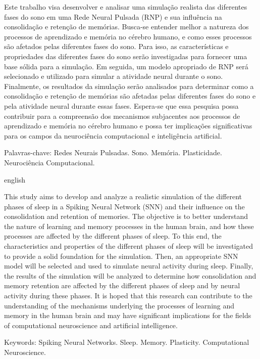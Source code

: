 \begin{resumo}
\noindent
 
Este trabalho visa desenvolver e analisar uma simulação realista das diferentes fases do sono em uma Rede Neural Pulsada (RNP)
e sua influência na consolidação e retenção de memórias. Busca-se entender melhor a natureza dos processos de aprendizado e
memória no cérebro humano, e como esses processos são afetados pelas diferentes fases do sono. Para isso, as características e
propriedades das diferentes fases do sono serão investigadas para fornecer uma base sólida para a simulação. Em seguida, um modelo
apropriado de RNP será selecionado e utilizado para simular a atividade neural durante o sono. Finalmente, os resultados da
simulação serão analisados para determinar como a consolidação e retenção de memórias são afetadas pelas diferentes fases do sono
e pela atividade neural durante essas fases. Espera-se que essa pesquisa possa contribuir para a compreensão dos mecanismos
subjacentes aos processos de aprendizado e memória no cérebro humano e possa ter implicações significativas para os campos da
neurociência computacional e inteligência artificial.

\vspace{0.2cm}   
Palavras-chave: Redes Neurais Pulsadas. Sono. Memória. Plasticidade. Neurociência Computacional. 
\end{resumo}
 
\begin{resumo}[Abstract]	
\begin{otherlanguage*}{english}
\noindent 
 
This study aims to develop and analyze a realistic simulation of the different phases of sleep in a Spiking Neural Network (SNN)
and their influence on the consolidation and retention of memories. The objective is to better understand the nature of learning
and memory processes in the human brain, and how these processes are affected by the different phases of sleep. To this end, the
characteristics and properties of the different phases of sleep will be investigated to provide a solid foundation for the
simulation. Then, an appropriate SNN model will be selected and used to simulate neural activity during sleep. Finally, the
results of the simulation will be analyzed to determine how consolidation and memory retention are affected by the different
phases of sleep and by neural activity during these phases. It is hoped that this research can contribute to the understanding of
the mechanisms underlying the processes of learning and memory in the human brain and may have significant implications for the
fields of computational neuroscience and artificial intelligence.
 
\vspace{0.2cm}
Keywords: Spiking Neural Networks. Sleep. Memory. Plasticity. Computational Neuroscience.
\end{otherlanguage*}
\end{resumo}

